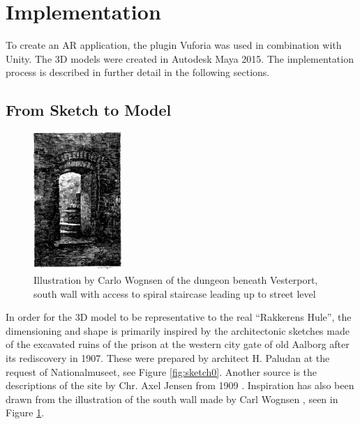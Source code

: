 \section{Implementation}
To create an AR application, the plugin Vuforia was used in combination with Unity. The 3D models were created in Autodesk Maya 2015. The implementation process is described in further detail in the following sections.

\subsection{From Sketch to Model}
\begin{figure}
\centering
        \includegraphics[width=0.3\textwidth]{figures/sketch1.png}
        \caption{Illustration by Carlo Wognsen of the dungeon beneath Vesterport, south wall with access to spiral staircase leading up to street level \cite{Riismoller1961}}\label{fig:sketch1}
\end{figure}

In order for the 3D model to be representative to the real “Rakkerens Hule”, the dimensioning and shape is primarily inspired by the architectonic sketches made of the excavated ruins of the prison at the western city gate of old Aalborg after its rediscovery in 1907. These were prepared by architect H. Paludan at the request of Nationalmuseet, see Figure \ref{fig:sketch0}. Another source is the descriptions of the site by Chr. Axel Jensen from 1909 \cite{Jensen1909}. Inspiration has also been drawn from the illustration of the south wall made by Carl Wognsen \cite{Riismoller1961}, seen in Figure \ref{fig:sketch1}.

